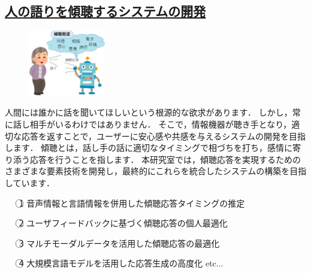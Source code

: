\documentclass[10.5pt,onecolumn]{jsarticle}
\newcommand{\dg}{\gt}
\newcommand{\maru}[1]{\textcircled{\scriptsize #1}}
\begin{document}
    \subsection*{\underline{人の語りを傾聴するシステムの開発}}

    \begin{figure}
      \vspace{-20mm}
      \begin{center}
        \includegraphics[width=0.3\textwidth]{./pic/robot.eps}\\
        \label{robot}
      \end{center}
    \end{figure}


    人間には誰かに話を聞いてほしいという根源的な欲求があります．
    しかし，常に話し相手がいるわけではありません．
    そこで，情報機器が聴き手となり，適切な応答を返すことで，ユーザーに安心感や共感を与えるシステムの開発を目指します．
    傾聴とは，話し手の話に適切なタイミングで相づちを打ち，感情に寄り添う応答を行うことを指します．
    本研究室では，傾聴応答を実現するためのさまざまな要素技術を開発し，最終的にこれらを統合したシステムの構築を目指しています．

    \begin{itemize}
      \item[\maru{1}] {\dg 音声情報と言語情報を併用した傾聴応答タイミングの推定}
      \item[\maru{2}] {\dg ユーザフィードバックに基づく傾聴応答の個人最適化}
      \item[\maru{3}] {\dg マルチモーダルデータを活用した傾聴応答の最適化}
      \item[\maru{4}] {\dg 大規模言語モデルを活用した応答生成の高度化} etc...
    \end{itemize}
\end{document}
